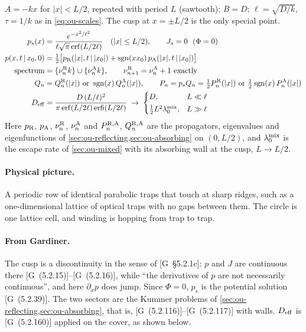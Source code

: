 \documentclass[11pt]{article}
\numberwithin{equation}{section}
\newcommand{\given}{\,|\,}
\newcommand{\G}[1]{[G~(#1)]}
\newcommand{\Gs}[1]{[G~\S#1]}
\begin{document}
\begin{keyresults}
$A=-kx$ for $|x|<L/2$, repeated with period $L$ (sawtooth); $B=D$; $\ell=\sqrt{D/k}$, $\tau=1/k$ as in
\cref{eq:ou-scales}. The cusp at $x=\pm L/2$ is the only special point.
\begin{align}
  p_s(x) &= \frac{e^{-x^2/\ell^2}}{\ell\sqrt\pi\operatorname{erf}(L/2\ell)}\quad(|x|\le L/2),\qquad
  J_s=0\ \ (\Phi=0) \\
  p(x,t\given x_0,0) &= \tfrac12\bigl[p_{\rm R}(|x|,t\given|x_0|)+\operatorname{sgn}(xx_0)\,
  p_{\rm A}(|x|,t\given|x_0|)\bigr] \\
  \text{spectrum} &= \{\nu^{\rm R}_nk\}\cup\{\nu^{\rm A}_nk\},\qquad \nu^{\rm R}_{n+1}=\nu^{\rm A}_n+1\ \text{exactly} \\
  Q_n &= Q^{\rm R}_n(|x|)\ \text{or}\ \operatorname{sgn}(x)\,Q^{\rm A}_n(|x|),\qquad
  P_n=p_sQ_n=\tfrac12P^{\rm R}_n(|x|)\ \text{or}\ \tfrac12\operatorname{sgn}(x)\,P^{\rm A}_n(|x|) \\
  D_{\rm eff} &= \frac{D\,(L/\ell)^2}{\pi\operatorname{erf}(L/2\ell)\operatorname{erfi}(L/2\ell)}
  \;\to\;\begin{cases}D, & L\ll\ell\\[2pt] \tfrac12L^2\lambda_0^{\rm mix}, & L\gg\ell\end{cases}
\end{align}
Here $p_{\rm R}$, $p_{\rm A}$, $\nu^{\rm R}_n$, $\nu^{\rm A}_n$ and $P^{\rm R,A}_n$, $Q^{\rm R,A}_n$ are the
propagators, eigenvalues and eigenfunctions of \cref{sec:ou-reflecting,sec:ou-absorbing} on $(0,L/2)$, and
$\lambda_0^{\rm mix}$ is the escape rate of
\cref{sec:ou-mixed} with its absorbing wall at the cusp, $L\to L/2$.
\end{keyresults}

\paragraph{Physical picture.} A periodic row of identical parabolic traps that touch at sharp ridges, such as a
one-dimensional lattice of optical traps with no gaps between them. The circle is one lattice cell, and winding
is hopping from trap to trap.

\paragraph{From Gardiner.} The cusp is a discontinuity in the sense of \Gs{5.2.1c}: $p$ and $J$ are continuous
there \G{5.2.15}--\G{5.2.16}, while ``the derivatives of $p$ are not necessarily continuous'', and here
$\partial_xp$ does jump. Since $\Phi=0$, $p_s$ is the potential solution \G{5.2.39}. The two sectors are the
Kummer problems of \cref{sec:ou-reflecting,sec:ou-absorbing}, that is, \G{5.2.116}--\G{5.2.117} with walls.
$D_{\rm eff}$ is \G{5.2.160} applied on the cover, as shown below.
\end{document}
